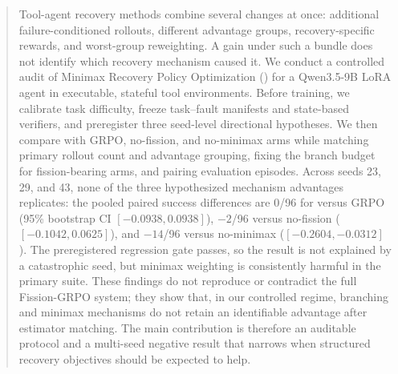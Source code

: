 \begin{abstract}
Tool-agent recovery methods combine several changes at once: additional
failure-conditioned rollouts, different advantage groups, recovery-specific
rewards, and worst-group reweighting.  A gain under such a bundle does not
identify which recovery mechanism caused it.  We conduct a controlled audit
of Minimax Recovery Policy Optimization (\method{}) for a Qwen3.5-9B LoRA
agent in executable, stateful tool environments.  Before training, we
calibrate task difficulty, freeze task--fault manifests and state-based
verifiers, and preregister three seed-level directional hypotheses.  We then
compare \method{} with GRPO, no-fission, and no-minimax arms while matching
primary rollout count and advantage grouping, fixing the branch budget for
fission-bearing arms, and pairing evaluation episodes.  Across seeds 23, 29,
and 43, none of the three hypothesized
mechanism advantages replicates: the pooled paired success differences are
0/96 for \method{} versus GRPO (95\% bootstrap CI
$[-0.0938,0.0938]$), $-2$/96 versus no-fission
($[-0.1042,0.0625]$), and $-14$/96 versus no-minimax
($[-0.2604,-0.0312]$).  The preregistered regression gate passes, so the
result is not explained by a catastrophic seed, but minimax weighting is
consistently harmful in the primary suite.  These findings do not reproduce
or contradict the full Fission-GRPO system; they show that, in our controlled
regime, branching and minimax mechanisms do not retain an identifiable
advantage after estimator matching.  The main contribution is therefore an
auditable protocol and a multi-seed negative result that narrows when
structured recovery objectives should be expected to help.
\end{abstract}
